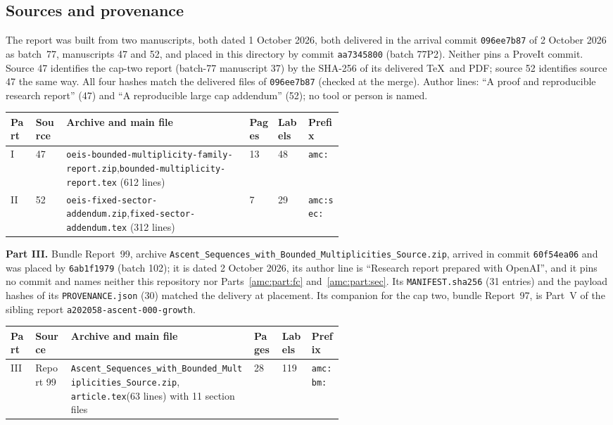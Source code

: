 \documentclass[11pt,letterpaper]{article}
\theoremstyle{remark}\newtheorem{remark}[theorem]{Remark}
\newcommand{\repopath}[1]{\nolinkurl{#1}}
\begin{document}
\subsection*{Sources and provenance}
\label{amc:guide:provenance}
The report was built from two manuscripts, both dated 1 October 2026, both delivered in the arrival commit \texttt{096ee7b87} of 2 October 2026 as batch~77, manuscripts 47 and 52, and placed in this directory by commit \texttt{aa7345800} (batch 77P2). Neither pins a ProveIt commit. Source 47 identifies the cap-two report (batch-77 manuscript 37) by the SHA-256 of its delivered \TeX\ and PDF; source 52 identifies source 47 the same way. All four hashes match the delivered files of \texttt{096ee7b87} (checked at the merge). Author lines: ``A proof and reproducible research report'' (47) and ``A reproducible large cap addendum'' (52); no tool or person is named.

\begin{center}
\footnotesize\setlength{\tabcolsep}{4pt}
\begin{tabular}{@{}llp{0.55\linewidth}lll@{}}
\toprule
Part & Source & Archive and main file & Pages & Labels & Prefix\\
\midrule
I & 47 & \texttt{oeis-bounded-multiplicity-family-report.zip},\newline \texttt{bounded-multiplicity-report.tex} (612 lines) & 13 & 48 & \texttt{amc:}\\
II & 52 & \texttt{oeis-fixed-sector-addendum.zip},\newline \texttt{fixed-sector-addendum.tex} (312 lines) & 7 & 29 & \texttt{amc:sec:}\\
\bottomrule
\end{tabular}
\end{center}

\noindent\textbf{Part III.} Bundle Report~99, archive \repopath{Ascent_Sequences_with_Bounded_Multiplicities_Source.zip}, arrived in commit \texttt{60f54ea06} and was placed by \texttt{6ab1f1979} (batch 102); it is dated 2 October 2026, its author line is ``Research report prepared with OpenAI'', and it pins no commit and names neither this repository nor Parts~\ref{amc:part:fc} and~\ref{amc:part:sec}. Its \texttt{MANIFEST.sha256} (31 entries) and the payload hashes of its \texttt{PROVENANCE.json} (30) matched the delivery at placement. Its companion for the cap two, bundle Report~97, is Part~V of the sibling report \repopath{a202058-ascent-000-growth}.

\begin{center}
\footnotesize\setlength{\tabcolsep}{4pt}
\begin{tabular}{@{}llp{0.55\linewidth}lll@{}}
\toprule
Part & Source & Archive and main file & Pages & Labels & Prefix\\
\midrule
III & Report 99 & \repopath{Ascent_Sequences_with_}\newline\repopath{Bounded_Multiplicities_Source.zip}, \texttt{article.tex}\newline (63 lines) with 11 section files & 28 & 119 & \texttt{amc:bm:}\\
\bottomrule
\end{tabular}
\end{center}
\end{document}

